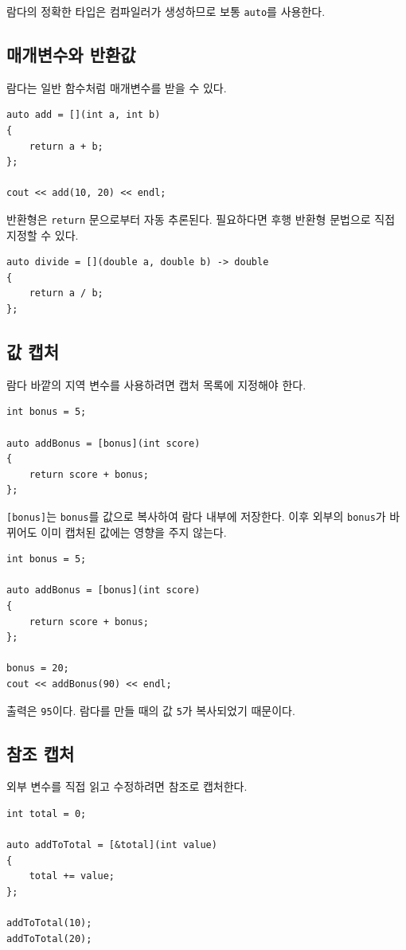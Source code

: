 \documentclass[11pt,a4paper]{article}
\begin{document}
람다의 정확한 타입은 컴파일러가 생성하므로 보통 \texttt{auto}를 사용한다.

\subsection{매개변수와 반환값}
람다는 일반 함수처럼 매개변수를 받을 수 있다.

\begin{lstlisting}
auto add = [](int a, int b)
{
    return a + b;
};

cout << add(10, 20) << endl;
\end{lstlisting}

반환형은 \texttt{return} 문으로부터 자동 추론된다. 필요하다면 후행 반환형 문법으로 직접 지정할 수 있다.

\begin{lstlisting}
auto divide = [](double a, double b) -> double
{
    return a / b;
};
\end{lstlisting}

\subsection{값 캡처}
람다 바깥의 지역 변수를 사용하려면 캡처 목록에 지정해야 한다.

\begin{lstlisting}
int bonus = 5;

auto addBonus = [bonus](int score)
{
    return score + bonus;
};
\end{lstlisting}

\texttt{[bonus]}는 \texttt{bonus}를 값으로 복사하여 람다 내부에 저장한다. 이후 외부의 \texttt{bonus}가 바뀌어도 이미 캡처된 값에는 영향을 주지 않는다.

\begin{lstlisting}
int bonus = 5;

auto addBonus = [bonus](int score)
{
    return score + bonus;
};

bonus = 20;
cout << addBonus(90) << endl;
\end{lstlisting}

출력은 \texttt{95}이다. 람다를 만들 때의 값 \texttt{5}가 복사되었기 때문이다.

\subsection{참조 캡처}
외부 변수를 직접 읽고 수정하려면 참조로 캡처한다.

\begin{lstlisting}
int total = 0;

auto addToTotal = [&total](int value)
{
    total += value;
};

addToTotal(10);
addToTotal(20);
\end{lstlisting}
\end{document}
